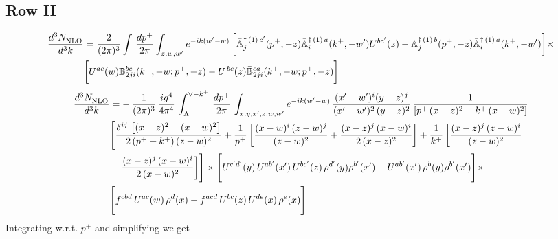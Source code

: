 \documentclass[9pt]{article}
\def\mf#1{\mathbb{#1}}
\numberwithin{equation}{section}
\begin{document}
\subsection{Row II\,}
\begin{align}
    \frac{d^{3}N_{\rm NLO}^{\rm}}{d^{3}k}  & =    \frac{2}{(2\pi)^{3}} \int\, \frac{dp^{+}}{2\pi}\int_{z,w,w^{\prime}} e^{-ik(w^{\prime}-w)}\,\bigg[\Bar{\mf{A}}^{\dagger\,(1)\, c^{\prime}}_{j}(p^{+},-z)\Bar{\mf{A}}^{\dagger\, (1)\, a}_{i}(k^{+},- w^{\prime})U^{bc^{\prime}}(z) - \mf{A}^{\dagger\, (1)\, b}_{j}(p^{+},- z)\Bar{\mf{A}}^{\dagger\, (1)\, a}_{i}(k^{+},- w^{\prime})\bigg] \times \notag \\ & \bigg[U^{ac}(w) \mf{B}^{bc}_{2ji}(k^{+},-w;p^{+},-z) -U^{\, bc}(z)\Bar{\mf{B}}^{ca}_{2ji}(k^{+},-w; p^{+},-z)\bigg] \nonumber
\end{align}
\begin{align}
    \frac{d^{3}N_{\rm NLO}^{\rm}}{d^{3}k}  & =  -\,\frac{1}{(2\pi)^{3}}\,\frac{ig^{4}}{4\pi^{4}}\,\int_{\Lambda}^{\vee-k^{+}}\,\frac{dp^{+}}{2\pi}\, \int_{x,y,x',z,w,w^{\prime}} e^{-ik(w^{\prime}-w)}\, \frac{(x'-w')^{i}(y-z)^{j}}{(x'-w')^{2}\,(y-z)^{2}}\, \frac{1}{\left[p^{+}\,(x-z)^{2}+k^{+}\,(x-w)^{2}\right]}\notag \\ & \Bigg[\frac{\delta^{ij}\, \left[(x-z)^{2}-(x-w)^{2}\right]}{2\, (p^{+}+k^{+})\,(z-w)^{2}}+\frac{1}{p^{+}}\, \bigg[\frac{(x-w)^{i}\,(z-w)^{j}}{(z-w)^{2}}+\frac{(x-z)^{j}\,(x-w)^{i}}{2\,(x-z)^{2}}\bigg]+\frac{1}{k^{+}}\,\bigg[\frac{(x-z)^{j}\,(z-w)^{i}}{(z-w)^{2}}\notag \\ & -\frac{(x-z)^{j}\,(x-w)^{i}}{2\,(x-w)^{2}}\bigg]\Bigg]\times \Bigg[U^{c'd'}(y)\,U^{ab'}(x')\,U^{bc'}(z)\,\rho^{d'}(y)\rho^{b'}(x')-U^{ab'}(x')\,\rho^{b}(y)\rho^{b'}(x')\Bigg]\times \notag \\ & \Bigg[f^{cbd}\,U^{ac}(w)\,\rho^{d}(x)-f^{acd}\, U^{bc}(z)\,U^{de}(x)\,\rho^{e}(x)\Bigg]
\end{align}
Integrating w.r.t. $p^{+}$ and simplifying we get
\end{document}
